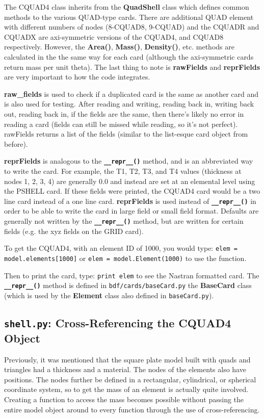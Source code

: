      The CQUAD4 class inherits from the {\bf QuadShell} class which defines common methods to the various QUAD-type cards.  There are additional QUAD element with different numbers of nodes (8-CQUAD8, 9-CQUAD) and the CQUADR and CQUADX are axi-symmetric versions of the CQUAD4, and CQUAD8 respectively.  However, the {\bf Area()}, {\bf Mass()}, {\bf Density()}, etc. methods are calculated in the the same way for each card (although the axi-symmetric cards return mass per unit theta).  The last thing to note is {\bf rawFields} and {\bf reprFields} are very important to how the code integrates.

     {\bf raw_fields} is used to check if a duplicated card is the same as another card and is also used for testing.  After reading and writing, reading back in, writing back out, reading back in, if the fields are the
     same, then there's likely no error in reading a card (fields can still be missed while reading, so it's not perfect).  rawFields returns a list of the fields (similar to the list-esque card object from before).

     {\bf reprFields} is analogous to the {\bf \tt \_\_repr\_\_()} method, and is an abbreviated way to write the card.  For example, the T1, T2, T3, and T4 values (thickness at nodes 1, 2, 3, 4) are generally 0.0 and instead are set at an elemental level using the PSHELL card.  If these fields were printed, the CQUAD4 card would be a two line card instead of a one line card.  {\bf reprFields} is used instead of {\bf \tt \_\_repr\_\_()} in order to be able to write the card in large field or small field format.  Defaults are generally not written by the {\bf \tt \_\_repr\_\_()} method, but are written for certain fields (e.g. the xyz fields on the GRID card).

     To get the CQUAD4, with an element ID of 1000, you would type:
       {\tt elem = model.elements[1000]} or
       {\tt elem = model.Element(1000)} to use the function.

     Then to print the card, type:
       {\tt print elem}
     to see the Nastran formatted card.  The {\bf \tt \_\_repr\_\_()} method is defined in {\tt bdf/cards/baseCard.py} the {\bf BaseCard} class (which is used by the {\bf Element} class also defined in {\tt baseCard.py}).

 \subsection{{\tt shell.py}: Cross-Referencing the CQUAD4 Object}
     Previously, it was mentioned that the square plate model built with quads and triangles had a thickness and a material.  The nodes of the elements also have positions.  The nodes further be defined in a rectangular, cylindrical, or spherical coordinate system, so to get the mass of an element is actually quite involved.  Creating a function to access the mass becomes possible without passing the entire model object around to every function through the use of cross-referencing.

